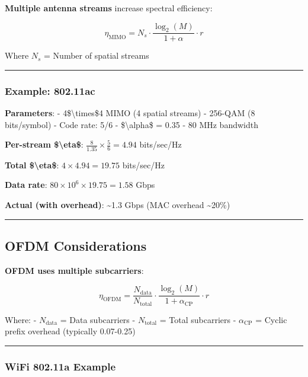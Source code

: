 \textbf{Multiple antenna streams} increase spectral efficiency:

\[
\eta_{\text{MIMO}} = N_s \cdot \frac{\log_2(M)}{1 + \alpha} \cdot r
\]

Where \(N_s\) = Number of spatial streams

\begin{center}\rule{0.5\linewidth}{0.5pt}\end{center}

\subsubsection{Example: 802.11ac}\label{example-802.11ac}

\textbf{Parameters}: - 4\$\textbackslash times\$4 MIMO (4 spatial
streams) - 256-QAM (8 bits/symbol) - Code rate: 5/6 -
\$\textbackslash alpha\$ = 0.35 - 80 MHz bandwidth

\textbf{Per-stream \$\textbackslash eta\$}:
\(\frac{8}{1.35} \times \frac{5}{6} = 4.94\) bits/sec/Hz

\textbf{Total \$\textbackslash eta\$}: \(4 \times 4.94 = 19.75\)
bits/sec/Hz

\textbf{Data rate}: \(80 \times 10^6 \times 19.75 = 1.58\) Gbps

\textbf{Actual (with overhead)}: \textasciitilde1.3 Gbps (MAC overhead
\textasciitilde20\%)

\begin{center}\rule{0.5\linewidth}{0.5pt}\end{center}

\subsection{OFDM Considerations}\label{ofdm-considerations}

\textbf{OFDM uses multiple subcarriers}:

\[
\eta_{\text{OFDM}} = \frac{N_{\text{data}}}{N_{\text{total}}} \cdot \frac{\log_2(M)}{1 + \alpha_{\text{CP}}} \cdot r
\]

Where: - \(N_{\text{data}}\) = Data subcarriers - \(N_{\text{total}}\) =
Total subcarriers - \(\alpha_{\text{CP}}\) = Cyclic prefix overhead
(typically 0.07-0.25)

\begin{center}\rule{0.5\linewidth}{0.5pt}\end{center}

\subsubsection{WiFi 802.11a Example}\label{wifi-802.11a-example}

